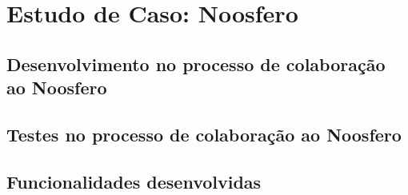 \chapter{Estudo de Caso: Noosfero}
\label{noosfero}


\section{Desenvolvimento no processo de colaboração ao Noosfero}

\section{Testes no processo de colaboração ao Noosfero}

\section{Funcionalidades desenvolvidas}

